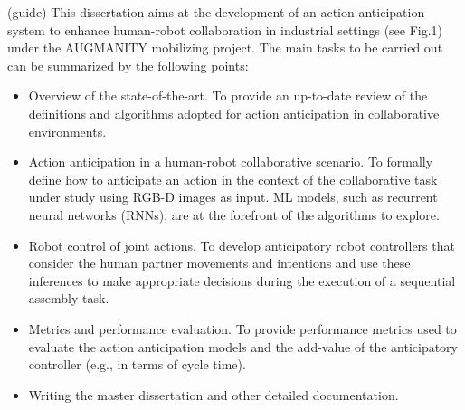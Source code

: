 {\color{red}
(guide) This dissertation aims at the development of an action anticipation system to enhance human-robot collaboration in industrial settings (see Fig.1) under the AUGMANITY mobilizing project. The main tasks to be carried out can be summarized by the following points:
\begin{itemize}
\item Overview of the state-of-the-art. To provide an up-to-date review of the definitions and algorithms adopted for action anticipation in collaborative environments.
\item Action anticipation in a human-robot collaborative scenario. To formally define how to anticipate an action in the context of the collaborative task under study using RGB-D images as input. ML models, such as recurrent neural networks (RNNs), are at the forefront of the algorithms to explore.
\item Robot control of joint actions. To develop anticipatory robot controllers that consider the human partner movements and intentions and use these inferences to make appropriate decisions during the execution of a sequential assembly task.
\item Metrics and performance evaluation. To provide performance metrics used to evaluate the action anticipation models and the add-value of the anticipatory controller (e.g., in terms of cycle time).
\item Writing the master dissertation and other detailed documentation.
\end{itemize}
}